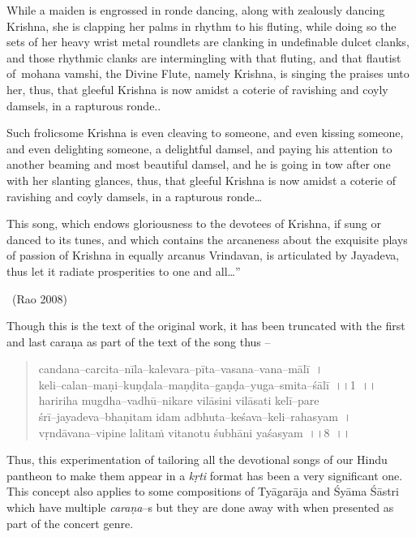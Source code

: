 \begin{myquote}
While a maiden is engrossed in ronde dancing, along with zealously dancing Krishna, she is clapping her palms in rhythm to his fluting, while doing so the sets of her heavy wrist metal roundlets are clanking in undefinable dulcet clanks, and those rhythmic clanks are intermingling with that fluting, and that flautist of mohana vamshi, the Divine Flute, namely Krishna, is singing the praises unto her, thus, that gleeful Krishna is now amidst a coterie of ravishing and coyly damsels, in a rapturous ronde..
\end{myquote}

\begin{myquote}
Such frolicsome Krishna is even cleaving to someone, and even kissing someone, and even delighting someone, a delightful damsel, and paying his attention to another beaming and most beautiful damsel, and he is going in tow after one with her slanting glances, thus, that gleeful Krishna is now amidst a coterie of ravishing and coyly damsels, in a rapturous ronde…
\end{myquote}

\begin{myquote}
This song, which endows gloriousness to the devotees of Krishna, if sung or danced to its tunes, and which contains the arcaneness about the exquisite plays of passion of Krishna in equally arcanus Vrindavan, is articulated by Jayadeva, thus let it radiate prosperities to one and all…” 

~\hfill (Rao 2008)
\end{myquote}

Though this is the text of the original work, it has been truncated with the first and last caraṇa as part of the text of the song thus –

\begin{verse}
candana–carcita–nīla–kalevara–pīta–vasana–vana–mālī~।\\ keli–calan–maṇi–kuṇḍala–maṇḍita–gaṇḍa–yuga–smita–śālī~।।1~।।\\ haririha mugdha–vadhū–nikare vilāsini vilāsati kelī–pare\\ śrī–jayadeva–bhaṇitam idam adbhuta–keśava–keli–rahasyam~।\\ vṛndāvana–vipine lalitaṁ vitanotu śubhāni yaśasyam~।।8~।।
\end{verse}

Thus, this experimentation of tailoring all the devotional songs of our Hindu pantheon to make them appear in a \textit{kṛti} format has been a very significant one. This concept also applies to some compositions of Tyāgarāja and Śyāma Śāstri which have multiple \textit{caraṇa}–s but they are done away with when presented as part of the concert genre.


